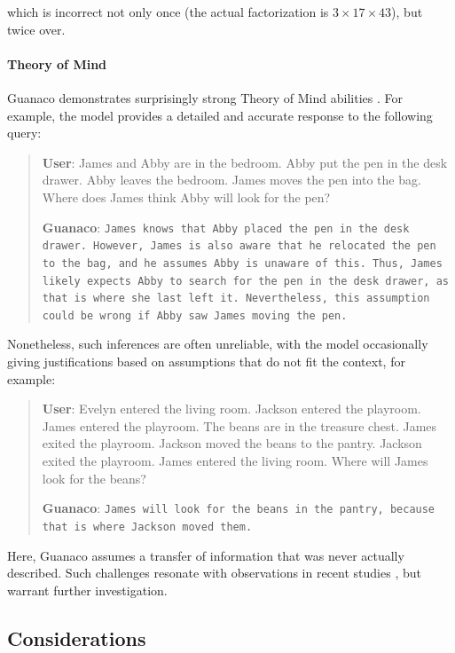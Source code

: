 which is incorrect not only once (the actual factorization is $3 \times 17 \times 43$), but twice over.

\paragraph{Theory of Mind} {Guanaco} demonstrates surprisingly strong Theory of Mind abilities \cite{nematzadeh2018evaluating, sap2022neural}. For example, the model provides a detailed and accurate response to the following query:

\begin{quote}
    \textbf{User}: James and Abby are in the bedroom. Abby put the pen in the desk drawer. Abby leaves the bedroom. James moves the pen into the bag. Where does James think Abby will look for the pen?

    \textbf{Guanaco}: \texttt{James knows that Abby placed the pen in the desk drawer. However, James is also aware that he relocated the pen to the bag, and he assumes Abby is unaware of this. Thus, James likely expects Abby to search for the pen in the desk drawer, as that is where she last left it. Nevertheless, this assumption could be wrong if Abby saw James moving the pen.}
\end{quote}

Nonetheless, such inferences are often unreliable, with the model occasionally giving justifications based on assumptions that do not fit the context, for example:

\begin{quote}
    \textbf{User}: Evelyn entered the living room. Jackson entered the playroom. James entered the playroom. The beans are in the treasure chest. James exited the playroom. Jackson moved the beans to the pantry. Jackson exited the playroom. James entered the living room. Where will James look for the beans?

    \textbf{Guanaco}: \texttt{James will look for the beans in the pantry, because that is where Jackson moved them.}
\end{quote}

Here, {Guanaco} assumes a transfer of information that was never actually described. Such challenges resonate with observations in recent studies \cite{sap2022neural}, but warrant further investigation.

\subsection{Considerations}
\label{ssec:considerations}

